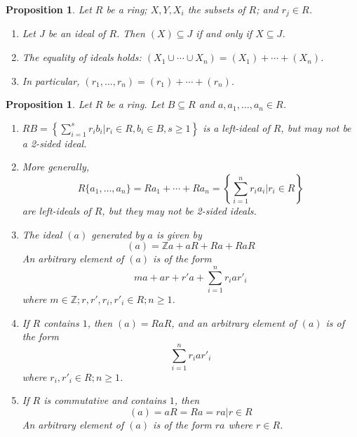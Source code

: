 \documentclass[a4paper,8pt]{article}
\theoremstyle{theorem}
\newtheorem{proposition}[theorem]{Proposition}
\begin{document}
\begin{proposition}
Let $R$ be a ring; $X, Y, X_i$ the subsets of $R$; and $r_j \in R$.
\begin{enumerate}[label=(\roman*)]
\item Let $J$ be an ideal of $R$. Then $(X) \subseteq J$ if and only if $X \subseteq J$.
\item The equality of ideals holds: $(X_1 \cup \cdots \cup X_n) = (X_1) + \cdots + (X_n)$.
\item In particular, $(r_1, \ldots, r_n) = (r_1) + \cdots + (r_n)$.
\end{enumerate}
\end{proposition}


\begin{proposition}
Let $R$ be a ring. Let $B\subseteq R$ and $a, a_1, \ldots, a_n \in R$.
\begin{enumerate}[label=(\roman*)]
\item $RB = \left\{\sum_{i=1}^{s} r_i b_i | r_i \in R, b_i \in B, s \geq 1 \right\}$ is a left-ideal of $R$, but may not be a 2-sided ideal.
\item More generally,
\begin{equation}
R\{a_1, \ldots, a_n\} = Ra_1 + \cdots + Ra_n = \left\{\sum_{i=1}^{n} r_i a_i | r_i \in R \right\} \nonumber	
\end{equation} 
are left-ideals of $R$, but they may not be 2-sided ideals.
\item The ideal $(a)$ generated by $a$ is given by
\begin{equation}
(a)=\mathbb{Z}a + aR + Ra + RaR \nonumber
\end{equation}
An arbitrary element of $(a)$ is of the form
\begin{equation}
ma + ar + r'a + \sum_{i=1}^{n} r_i a r'_i \nonumber
\end{equation}
where $m\in \mathbb{Z}; r, r', r_i, r'_i \in R; n \geq 1$.
\item If $R$ contains $1$, then $(a)=RaR$, and an arbitrary element of $(a)$ is of the form 
\begin{equation}
\sum_{i=1}^{n} r_i a r'_i \nonumber
\end{equation} 
where $r_i, r'_i \in R; n \geq 1$.
\item If $R$ is commutative and contains $1$, then
\begin{equation}
(a)=aR=Ra={ra|r\in R} \nonumber
\end{equation} 
An arbitrary element of $(a)$ is of the form $ra$ where $r \in R$.
\end{enumerate}
\end{proposition}
\end{document}
